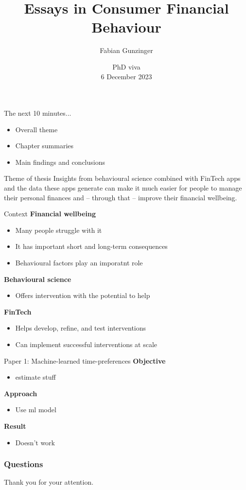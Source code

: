 \documentclass[xcolor=svgnames]{beamer}
\title{Essays in Consumer Financial Behaviour}
\author{Fabian Gunzinger \inst{1}}
\institute
{
    \inst{1}%
    University of Warwick\\
    \url{fabian.gunzinger@warwick.ac.uk}
}
\date {PhD viva \\ \vspace{1mm} 6 December 2023}
\begin{document}
\begin{frame}
  \titlepage
\end{frame}

\begin{frame}{The next 10 minutes...}
    \begin{itemize}
        \item Overall theme
        \item Chapter summaries
        \item Main findings and conclusions
    \end{itemize}
\end{frame}

\begin{frame}{Theme of thesis}
    Insights from behavioural science combined with FinTech apps and the data
    these apps generate can make it much easier for people to manage their personal finances and -- through that -- improve their financial wellbeing.
\end{frame}


\begin{frame}{Context}
    \textbf{Financial wellbeing}
    \begin{itemize}
        \item Many people struggle with it
        \item It has important short and long-term consequences
        \item Behavioural factors play an imporatnt role
    \end{itemize}

    \textbf{Behavioural science}
    \begin{itemize}
        \item Offers intervention with the potential to help
    \end{itemize}
    
    \textbf{FinTech}
    \begin{itemize}
        \item Helps develop, refine, and test interventions
        \item Can implement successful interventions at scale
    \end{itemize}
\end{frame}


\begin{frame}{Paper 1: Machine-learned time-preferences}
    \textbf{Objective}
    \begin{itemize}
        
        \item estimate stuff
    \end{itemize}

    \textbf{Approach}
    \begin{itemize}
        
        \item Use ml model
    \end{itemize}

    \textbf{Result}
    \begin{itemize}
        \item Doesn't work
    \end{itemize}
\end{frame}

\begin{frame}\frametitle{Questions}
    Thank you for your attention.
\end{frame}
\end{document}
